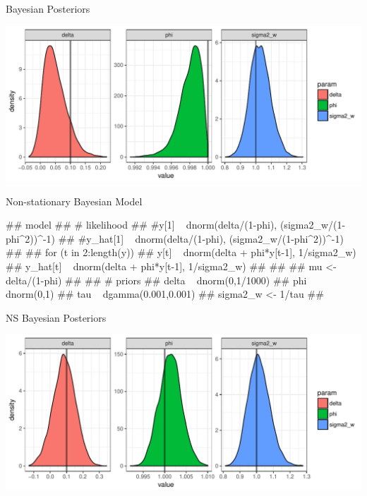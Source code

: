 \documentclass[11pt,ignorenonframetext,]{beamer}
\let\oldverbatim\verbatim
\let\endoldverbatim\endverbatim
\renewenvironment{verbatim}{\footnotesize\begin{spacing}{0.9}\oldverbatim}{\endoldverbatim\end{spacing}}
\begin{document}
\begin{frame}{Bayesian Posteriors}

\begin{center}\includegraphics{Lec10_files/figure-beamer/unnamed-chunk-10-1} \end{center}

\end{frame}

\begin{frame}[fragile,t]{Non-stationary Bayesian Model}

\begin{verbatim}
## model{
## # likelihood
##   #y[1] ~ dnorm(delta/(1-phi), (sigma2_w/(1-phi^2))^-1)
##   #y_hat[1] ~ dnorm(delta/(1-phi), (sigma2_w/(1-phi^2))^-1)
## 
##   for (t in 2:length(y)) {
##     y[t] ~ dnorm(delta + phi*y[t-1], 1/sigma2_w)
##     y_hat[t] ~ dnorm(delta + phi*y[t-1], 1/sigma2_w)
##   }
##   
##   mu <- delta/(1-phi)
## 
## # priors
##   delta ~ dnorm(0,1/1000)
##   phi ~ dnorm(0,1)
##   tau ~ dgamma(0.001,0.001)
##   sigma2_w <- 1/tau
## }
\end{verbatim}

\end{frame}

\begin{frame}{NS Bayesian Posteriors}

\begin{center}\includegraphics{Lec10_files/figure-beamer/unnamed-chunk-12-1} \end{center}

\end{frame}
\end{document}
